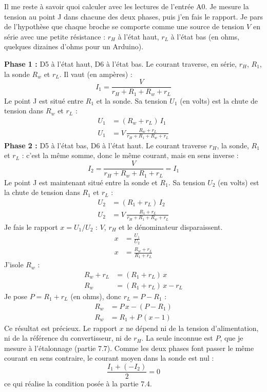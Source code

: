 Il me reste à savoir quoi calculer avec les lectures de l'entrée A0. Je mesure la tension au point J dans chacune des deux phases, puis j'en fais le rapport. Je pars de l'hypothèse que chaque broche se comporte comme une source de tension $V$ en série avec une petite résistance : $r_H$ à l'état haut, $r_L$ à l'état bas (en ohms, quelques dizaines d'ohms pour un Arduino).

\begin{demonstration}
\textbf{Phase 1 :} D5 à l'état haut, D6 à l'état bas. Le courant traverse, en série, $r_H$, $R_1$, la sonde $R_w$ et $r_L$. Il vaut (en ampères) :
\[
I_1 = \frac{V}{r_H + R_1 + R_w + r_L}
\]
Le point J est situé entre $R_1$ et la sonde. Sa tension $U_1$ (en volts) est la chute de tension dans $R_w$ et $r_L$ :
\begin{align*}
U_1 &= (R_w + r_L)\,I_1\\
U_1 &= V\,\frac{R_w + r_L}{r_H + R_1 + R_w + r_L}
\end{align*}
\textbf{Phase 2 :} D5 à l'état bas, D6 à l'état haut. Le courant traverse $r_H$, la sonde, $R_1$ et $r_L$ : c'est la même somme, donc le même courant, mais en sens inverse :
\[
I_2 = \frac{V}{r_H + R_w + R_1 + r_L} = I_1
\]
Le point J est maintenant situé entre la sonde et $R_1$. Sa tension $U_2$ (en volts) est la chute de tension dans $R_1$ et $r_L$ :
\begin{align*}
U_2 &= (R_1 + r_L)\,I_2\\
U_2 &= V\,\frac{R_1 + r_L}{r_H + R_1 + R_w + r_L}
\end{align*}
Je fais le rapport $x = U_1/U_2$ : $V$, $r_H$ et le dénominateur disparaissent.
\begin{align*}
x &= \frac{U_1}{U_2}\\
x &= \frac{R_w + r_L}{R_1 + r_L}
\end{align*}
J'isole $R_w$ :
\begin{align*}
R_w + r_L &= (R_1 + r_L)\,x\\
R_w &= (R_1 + r_L)\,x - r_L
\end{align*}
Je pose $P = R_1 + r_L$ (en ohms), donc $r_L = P - R_1$ :
\begin{align*}
R_w &= P\,x - (P - R_1)\\
R_w &= R_1 + P\,(x - 1)
\end{align*}
Ce résultat est précieux. Le rapport $x$ ne dépend ni de la tension d'alimentation, ni de la référence du convertisseur, ni de $r_H$. La seule inconnue est $P$, que je mesure à l'étalonnage (partie 7.7). Comme les deux phases font passer le même courant en sens contraire, le courant moyen dans la sonde est nul :
\[
\frac{I_1 + (-I_2)}{2} = 0
\]
ce qui réalise la condition posée à la partie 7.4.
\end{demonstration}

